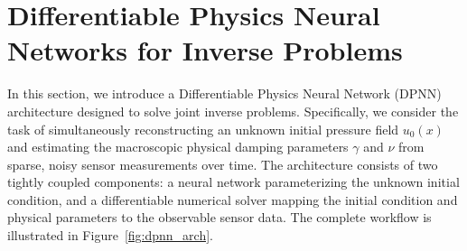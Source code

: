 \documentclass{Configuration_Files/PoliMi3i_thesis}
\begin{document}
\section{Differentiable Physics Neural Networks for Inverse Problems}
\label{sec:dpnn}
In this section, we introduce a Differentiable Physics Neural Network (DPNN) architecture designed to solve joint inverse problems. Specifically, we consider the task of simultaneously reconstructing an unknown initial pressure field $u_0(x)$ and estimating the macroscopic physical damping parameters $\gamma$ and $\nu$ from sparse, noisy sensor measurements over time.
The architecture consists of two tightly coupled components: a neural network parameterizing the unknown initial condition, and a differentiable numerical solver mapping the initial condition and physical parameters to the observable sensor data. The complete workflow is illustrated in Figure~\ref{fig:dpnn_arch}.
\end{document}
